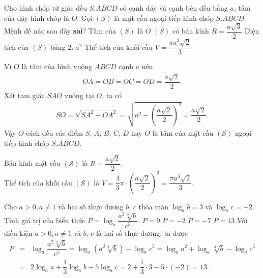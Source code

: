 \begin{ex}%
 Cho hình chóp tứ giác đều $S.ABCD$ có cạnh đáy và cạnh bên đều bằng $a$, tâm của đáy hình chóp là $O$. Gọi $(\mathcal{S})$ là mặt cầu ngoại tiếp hình chóp $S.ABCD$. Mệnh đề nào sau đây \textbf{sai}?
 \choice
  {Tâm của $(S)$ là $O$}
  {\True $(S)$ có bán kính $R = \dfrac{a\sqrt{3}}{2}$}
  {Diện tích của $(S)$ bằng $2 \pi a^2$}
  {Thể tích của khối cầu $V = \dfrac{\pi a^3 \sqrt{2}}{3}$}
 \loigiai
  {
  \immini
  {
  Vì $O$ là tâm của hình vuông $ABCD$ cạnh $a$ nên
  \begin{eqnarray*}
   OA = OB = OC = OD = \dfrac{a\sqrt{2}}{2}.
  \end{eqnarray*}
  Xét tam giác $SAO$ vuông tại $O$, ta có
  \begin{eqnarray*}
   SO = \sqrt{SA^2 - OA^2} = \sqrt{a^2 - \left( \dfrac{a\sqrt{2}}{2}\right)^2} = \dfrac{a\sqrt{2}}{2}.
  \end{eqnarray*}
  Vậy $O$ cách đều các điểm $S$, $A$, $B$, $C$, $D$ hay $O$ là tâm của mặt cầu $(\mathcal{S})$ ngoại tiếp hình chóp $S.ABCD$.
  }
  {
  }
  \noindent
  Bán kính mặt cầu $(\mathcal{S})$ là $R = \dfrac{a\sqrt{2}}{2}$.\\
  Thể tích của khối cầu $(\mathcal{S})$ là $V = \dfrac{4}{3} \pi \cdot \left( \dfrac{a\sqrt{2}}{2}\right)^3 = \dfrac{\pi a^3 \sqrt{2}}{3}$.
  }
\end{ex}

\begin{ex}%
 Cho $a > 0, a \neq 1$ và hai số thực dương $b$, $c$ thỏa mãn $\log_a b = 3$ và $\log_a c = -2$. Tính giá trị của biểu thức $P = \log_a \dfrac{a^2 \sqrt[3]{b}}{c^5}$.
 \choice
  {$P = 9$}
  {$P = -2$}
  {$P = -7$}
  {\True $P = 13$}
 \loigiai
  {
  Với điều kiện $a > 0, a \neq 1$ và $b$, $c$ là hai số thực dương, ta được
  \begin{eqnarray*}
   P & =& \log_a \dfrac{a^2 \sqrt[3]{b}}{c^5} = \log_a \left( a^2 \sqrt[3]{b} \right) - \log_a c^5 = \log_a a^2 + \log_a \sqrt[3]{b} - \log_a c^5 \\
     & =& 2 \log_a a + \dfrac{1}{3} \log_a b - 5 \log_a c = 2 + \dfrac{1}{3} \cdot 3 - 5 \cdot (-2) = 13.
  \end{eqnarray*}
  }
\end{ex}


